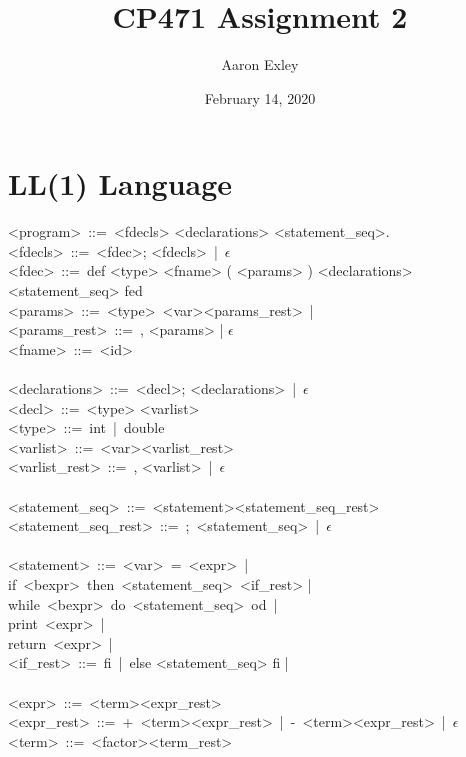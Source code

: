 \documentclass{article}
\title{CP471 Assignment 2}
\date{February 14, 2020}
\author{Aaron Exley}
\begin{document}
\maketitle

\section*{LL(1) Language}

\noindent
<program>\ ::=\ <fdecls> <declarations> <statement\_seq>.\\
<fdecls>\ ::=\ <fdec>; <fdecls>\ |\ $\epsilon$ \\
<fdec>\ ::=\ def <type> <fname> ( <params> ) <declarations> <statement\_seq> fed\\
<params>\ ::=\ <type>\ <var><params\_rest>\ |\\
<params\_rest>\ ::=\ , <params> | $\epsilon$ \\
<fname>\ ::=\ <id>\\
\\
<declarations>\ ::=\ <decl>; <declarations>\ |\ $\epsilon$\\
<decl>\ ::=\ <type> <varlist>\\
<type>\ ::=\ int\ |\ double\\
<varlist>\ ::=\ <var><varlist\_rest>\\
<varlist\_rest>\ ::=\ , <varlist>\ |\ $\epsilon$\\
\\
<statement\_seq>\ ::=\ <statement><statement\_seq\_rest>\\
<statement\_seq\_rest>\ ::=\ ;\ <statement\_seq>\ |\ $\epsilon$\\
\\
<statement>\ ::=\ <var>\ =\ <expr>\ |\\
\null\qquad\qquad\qquad\qquad if\ <bexpr>\ then\ <statement\_seq>\ <if\_rest> |\\
\null\qquad\qquad\qquad\qquad while\ <bexpr>\ do\ <statement\_seq>\ od\ |\\
\null\qquad\qquad\qquad\qquad print\ <expr>\ |\\
\null\qquad\qquad\qquad\qquad return\ <expr>\ |\\
<if\_rest>\ ::=\ fi\ |\ else <statement\_seq> fi |\\
\\
<expr>\ ::=\ <term><expr\_rest>\\
<expr\_rest>\ ::=\ +\ <term><expr\_rest>\ |\ -\ <term><expr\_rest>\ |\ $\epsilon$\\
<term>\ ::=\ <factor><term\_rest>\\
\end{document}
